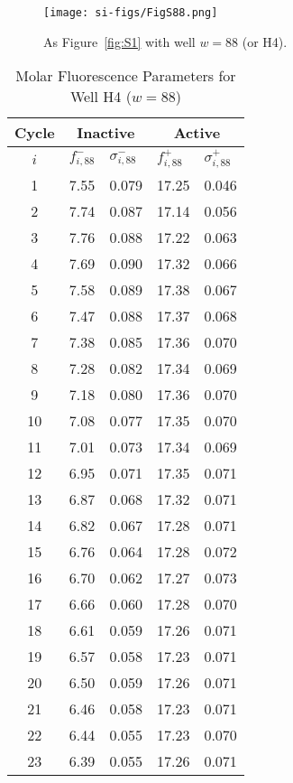                 \begin{figure}
                    \centering
                    \texttt{[image: si-figs/FigS88.png]}
                    \caption{
                        As Figure~\ref{fig:S1} with well $w=88$ (or H4).
                    }
                \end{figure}
                \clearpage
    \begin{table}
        \caption{Molar Fluorescence Parameters for Well H4 ($w=88$)}
        \centering
        \begin{tabular}{c|ll|ll}
            Cycle & \multicolumn{2}{c|}{Inactive} & \multicolumn{2}{c}{Active} \\
            \hline
            $i$ & $f_{i,88}^{-}$ & $\sigma_{i,88}^{-}$ &  $f_{i,88}^{+}$ & $\sigma_{i,88}^{+}$ \\
            \hline
    1 & 7.55 & 0.079 & 17.25 & 0.046 \\
2 & 7.74 & 0.087 & 17.14 & 0.056 \\
3 & 7.76 & 0.088 & 17.22 & 0.063 \\
4 & 7.69 & 0.090 & 17.32 & 0.066 \\
5 & 7.58 & 0.089 & 17.38 & 0.067 \\
6 & 7.47 & 0.088 & 17.37 & 0.068 \\
7 & 7.38 & 0.085 & 17.36 & 0.070 \\
8 & 7.28 & 0.082 & 17.34 & 0.069 \\
9 & 7.18 & 0.080 & 17.36 & 0.070 \\
10 & 7.08 & 0.077 & 17.35 & 0.070 \\
11 & 7.01 & 0.073 & 17.34 & 0.069 \\
12 & 6.95 & 0.071 & 17.35 & 0.071 \\
13 & 6.87 & 0.068 & 17.32 & 0.071 \\
14 & 6.82 & 0.067 & 17.28 & 0.071 \\
15 & 6.76 & 0.064 & 17.28 & 0.072 \\
16 & 6.70 & 0.062 & 17.27 & 0.073 \\
17 & 6.66 & 0.060 & 17.28 & 0.070 \\
18 & 6.61 & 0.059 & 17.26 & 0.071 \\
19 & 6.57 & 0.058 & 17.23 & 0.071 \\
20 & 6.50 & 0.059 & 17.26 & 0.071 \\
21 & 6.46 & 0.058 & 17.23 & 0.071 \\
22 & 6.44 & 0.055 & 17.23 & 0.070 \\
23 & 6.39 & 0.055 & 17.26 & 0.071 \\

\end{tabular}
\end{table}
